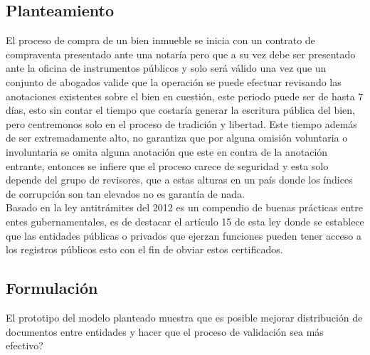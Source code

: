 \subsection{Planteamiento}

El proceso de compra de un bien inmueble se inicia con un contrato de compraventa presentado ante una notaría pero que a su vez debe ser presentado ante la oficina de instrumentos públicos y solo será válido una vez que un conjunto de abogados valide que la operación se puede efectuar revisando las anotaciones existentes sobre el bien en cuestión, este periodo puede ser de hasta 7 días, esto sin contar el tiempo que costaría generar la escritura pública del bien, pero centremonos solo en el proceso de tradición y libertad. Este tiempo además de ser extremadamente alto, no garantiza que por alguna omisión voluntaria o involuntaria se omita alguna anotación que este en contra de la anotación entrante, entonces se infiere que el proceso carece de seguridad y esta solo depende del grupo de revisores, que a estas alturas en un país donde los índices de corrupción son tan elevados no es garantía de nada. 
\\
Basado en la ley antitrámites del 2012 es un compendio de buenas prácticas entre entes gubernamentales, es de destacar el artículo 15 de esta ley donde se establece que las entidades públicas o privados que ejerzan funciones pueden tener acceso a los registros públicos esto con el fin de obviar estos certificados.

\subsection{Formulación}
El prototipo del modelo planteado muestra que es posible mejorar distribución de documentos entre entidades  y hacer que el proceso de validación sea más efectivo?

